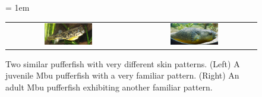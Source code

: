 \begin{figure}[h]
\centering
\mySfFamily
\tabcolsep = 1em
\begin{tabular}{c c}
\includegraphics[width = 0.4\textwidth]{../images/Juvenile_Mbu_pufferfish.jpg} & \includegraphics[width = 0.4\textwidth]{../images/Giant_Puffer_fish_skin_pattern.jpg}
\end{tabular}
\caption{Two similar pufferfish with very different skin patterns. (Left) A juvenile Mbu pufferfish with a very familiar pattern. (Right) An adult Mbu pufferfish exhibiting another familiar pattern.}
\label{fig:pufferfish}
\end{figure}
